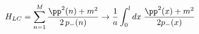 \begin{equation}
\label{eq:M particle Hamiltonian 3}
    H_{LC}= \sum_{n=1}^M
    \frac{\pp^2 (n) + m^2}{2 \, p_- (n)}
    \to
    \frac 1a \int_0^l dx\;
    \frac{\pp^2 (x) + m^2}{2 p_- (x)}
\end{equation}

